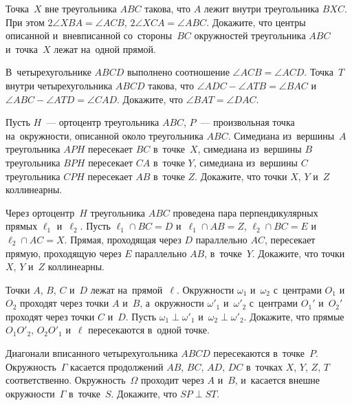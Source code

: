 


\begin{problems}

\item
Точка~$X$ вне треугольника $ABC$ такова, что $A$ лежит внутри
треугольника $BXC$.
При этом $2 \angle XBA = \angle ACB$, $2 \angle XCA = \angle ABC$.
Докажите, что центры описанной и~вневписанной со~стороны~$BC$ окружностей
треугольника $ABC$ и~точка~$X$ лежат на~одной прямой.

\item
В~четырехугольнике $ABCD$ выполнено соотношение $\angle ACB = \angle ACD$.
Точка~$T$ внутри четырехугольника $ABCD$ такова, что
$\angle ADC - \angle ATB = \angle BAC$
и~$\angle ABC - \angle ATD = \angle CAD$.
Докажите, что $\angle BAT = \angle DAC$.

\item
Пусть $H$~--- ортоцентр треугольника $ABC$, $P$~--- произвольная точка
на~окружности, описанной около треугольника $ABC$.
Симедиана из~вершины~$A$ треугольника $APH$ пересекает $BC$ в~точке~$X$,
симедиана из~вершины $B$ треугольника $BPH$ пересекает $CA$ в~точке $Y$,
симедиана из~вершины $C$ треугольника $CPH$ пересекает $AB$ в~точке $Z$.
Докажите, что точки $X$, $Y$ и~$Z$ коллинеарны.

\item
Через ортоцентр~$H$ треугольника $ABC$ проведена пара перпендикулярных
прямых $\ell_{1}$ и~$\ell_{2}$.
Пусть $\ell_{1} \cap BC = D$ и~$\ell_{1} \cap AB = Z$,
$\ell_{2} \cap BC = E$ и~$\ell_{2} \cap AC = X$.
Прямая, проходящая через $D$ параллельно $AC$, пересекает прямую, проходящую
через $E$ параллельно $AB$, в~точке~$Y$.
Докажите, что точки $X$, $Y$ и~$Z$ коллинеарны.

\item
Точки $A$, $B$, $C$ и~$D$ лежат на~прямой~$\ell$.
Окружности $\omega_{1}$ и~$\omega_{2}$ с~центрами $O_{1}$ и~$O_{2}$
проходят через точки $A$ и~$B$,
а~окружности $\omega'_{1}$ и~$\omega'_{2}$ с~центрами $O_{1}'$ и~$O_{2}'$
проходят через точки $C$ и~$D$.
Пусть $\omega_{1} \perp \omega'_{1}$ и~$\omega_{2} \perp \omega'_{2}$.
Докажите, что прямые $O_{1}O'_{2}$, $O_{2}O'_{1}$ и~$\ell$ пересекаются
в~одной точке.

\item
Диагонали вписанного четырехугольника $ABCD$ пересекаются в~точке~$P$.
Окружность~$\Gamma$ касается продолжений $AB$, $BC$, $AD$, $DC$
в~точках $X$, $Y$, $Z$, $T$ соответственно.
Окружность~$\Omega$ проходит через $A$ и~$B$, и~касается внешне
окружности~$\Gamma$ в~точке~$S$.
Докажите, что $SP \perp ST$.


\end{problems}
